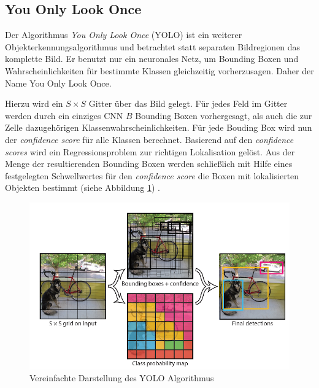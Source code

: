 \subsection*{You Only Look Once}

Der Algorithmus \textit{You Only Look Once} (YOLO) ist ein weiterer Objekterkennungsalgorithmus und betrachtet statt separaten Bildregionen das komplette Bild. Er benutzt nur ein neuronales Netz, um Bounding Boxen und Wahrscheinlichkeiten für bestimmte Klassen gleichzeitig vorherzusagen. Daher der Name \glqq You Only Look Once\grqq{}.

Hierzu wird ein $S \times S$ Gitter über das Bild gelegt. Für jedes Feld im Gitter werden durch ein einziges CNN $B$ Bounding Boxen vorhergesagt, als auch die zur Zelle dazugehörigen Klassenwahrscheinlichkeiten. Für jede Bouding Box wird nun der \textit{confidence score} für alle Klassen berechnet. Basierend auf den \textit{confidence scores} wird ein Regressionsproblem zur richtigen Lokalisation gelöst. Aus der Menge der resultierenden Bounding Boxen werden schließlich mit Hilfe eines festgelegten Schwellwertes für den \textit{confidence score} die Boxen mit lokalisierten Objekten bestimmt (siehe Abbildung \ref{yolo_model}) \cite{JosephRedmon.2016}.

\begin{figure}[ht]
	\begin{center}
		\includegraphics[width=15cm]{Bilder/yolo_model.png} 
		\caption[Vereinfachte Darstellung des YOLO Algorithmus]{Vereinfachte Darstellung des YOLO Algorithmus \cite{JosephRedmon.2016}}
		\label{yolo_model}
	\end{center}
\end{figure}

\newpage

